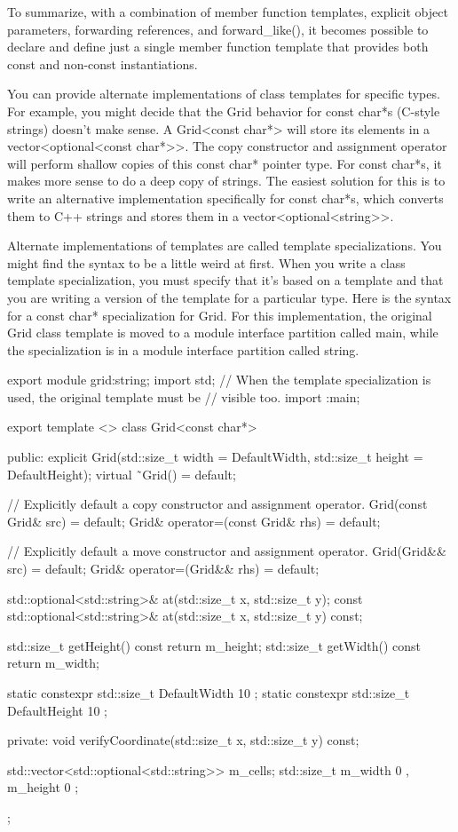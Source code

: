 To summarize, with a combination of member function templates, explicit object parameters, forwarding references, and forward\_like(), it becomes possible to declare and define just a single member function template that provides both const and non-const instantiations.


You can provide alternate implementations of class templates for specific types. For example, you might decide that the Grid behavior for const char*s (C-style strings) doesn’t make sense. A Grid<const char*> will store its elements in a vector<optional<const char*>{}>. The copy constructor and assignment operator will perform shallow copies of this const char* pointer type. For const char*s, it makes more sense to do a deep copy of strings. The easiest solution for this is to write an alternative implementation specifically for const char*s, which converts them to C++ strings and stores them in a vector<optional<string>{}>.

Alternate implementations of templates are called template specializations. You might find the syntax to be a little weird at first. When you write a class template specialization, you must specify that it’s based on a template and that you are writing a version of the template for a particular type. Here is the syntax for a const char* specialization for Grid. For this implementation, the original Grid class template is moved to a module interface partition called main, while the specialization is in a module interface partition called string.


\begin{cpp}
export module grid:string;
import std;
// When the template specialization is used, the original template must be
// visible too.
import :main;

export template <>
class Grid<const char*>
{
    public:
        explicit Grid(std::size_t width = DefaultWidth,
            std::size_t height = DefaultHeight);
        virtual ˜Grid() = default;

        // Explicitly default a copy constructor and assignment operator.
        Grid(const Grid& src) = default;
        Grid& operator=(const Grid& rhs) = default;

        // Explicitly default a move constructor and assignment operator.
        Grid(Grid&& src) = default;
        Grid& operator=(Grid&& rhs) = default;

        std::optional<std::string>& at(std::size_t x, std::size_t y);
        const std::optional<std::string>& at(std::size_t x, std::size_t y) const;

        std::size_t getHeight() const { return m_height; }
        std::size_t getWidth() const { return m_width; }

        static constexpr std::size_t DefaultWidth { 10 };
        static constexpr std::size_t DefaultHeight { 10 };

    private:
        void verifyCoordinate(std::size_t x, std::size_t y) const;

        std::vector<std::optional<std::string>> m_cells;
        std::size_t m_width { 0 }, m_height { 0 };
};
\end{cpp}

